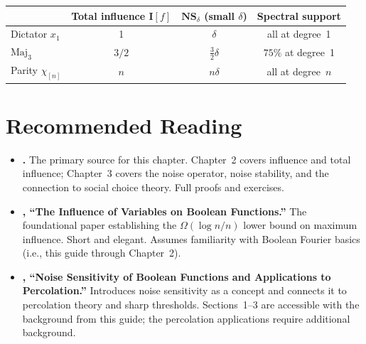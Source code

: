 \begin{center}
\begin{tabular}{lccc}
\toprule
& Total influence $\mathbf{I}[f]$ & $\mathbf{NS}_\delta$ (small $\delta$) & Spectral support \\
\midrule
Dictator $x_1$ & 1 & $\delta$ & all at degree~1 \\
$\text{Maj}_3$ & $3/2$ & $\tfrac{3}{2}\delta$ & $75\%$ at degree~1 \\
Parity $\chi_{[n]}$ & $n$ & $n\delta$ & all at degree~$n$ \\
\bottomrule
\end{tabular}
\end{center}


\section*{Recommended Reading}

\begin{itemize}
  \item \textbf{\citet[Chapters~2--3]{odonnell2014analysis}.}
    The primary source for this chapter. Chapter~2 covers influence and
    total influence; Chapter~3 covers the noise operator, noise stability,
    and the connection to social choice theory. Full proofs and exercises.

  \item \textbf{\citet{kahn1988influence}, ``The Influence of Variables
    on Boolean Functions.''}
    The foundational paper establishing the $\Omega(\log n / n)$ lower
    bound on maximum influence. Short and elegant. Assumes familiarity
    with Boolean Fourier basics (i.e., this guide through Chapter~2).

  \item \textbf{\citet{benjamini1999noise}, ``Noise Sensitivity of
    Boolean Functions and Applications to Percolation.''}
    Introduces noise sensitivity as a concept and connects it to
    percolation theory and sharp thresholds. Sections~1--3 are
    accessible with the background from this guide; the percolation
    applications require additional background.
\end{itemize}
